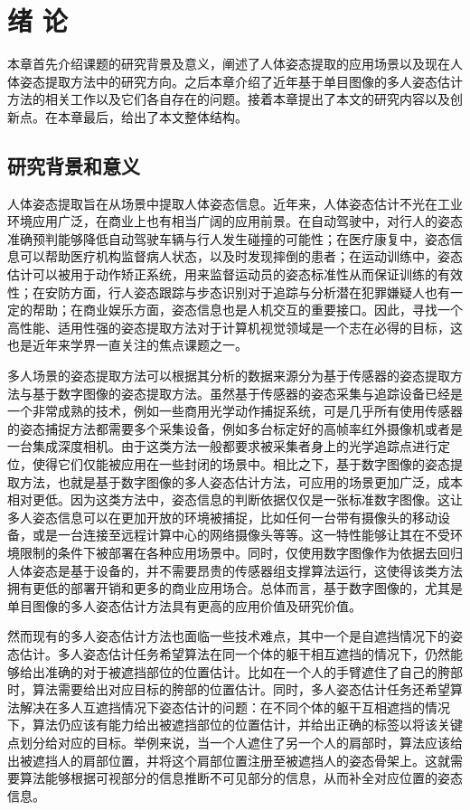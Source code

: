 \chapter{绪 论}
\label{cha:intro}

本章首先介绍课题的研究背景及意义，阐述了人体姿态提取的应用场景以及现在人体姿态提取方法中的研究方向。之后本章介绍了近年基于单目图像的多人姿态估计方法的相关工作以及它们各自存在的问题。接着本章提出了本文的研究内容以及创新点。在本章最后，给出了本文整体结构。

\section{研究背景和意义}
\label{sec:generalbackground}
人体姿态提取旨在从场景中提取人体姿态信息。近年来，人体姿态估计不光在工业环境应用广泛，在商业上也有相当广阔的应用前景。在自动驾驶中，对行人的姿态准确预判能够降低自动驾驶车辆与行人发生碰撞的可能性；在医疗康复中，姿态信息可以帮助医疗机构监督病人状态，以及时发现摔倒的患者；在运动训练中，姿态估计可以被用于动作矫正系统，用来监督运动员的姿态标准性从而保证训练的有效性；在安防方面，行人姿态跟踪与步态识别对于追踪与分析潜在犯罪嫌疑人也有一定的帮助；在商业娱乐方面，姿态信息也是人机交互的重要接口。因此，寻找一个高性能、适用性强的姿态提取方法对于计算机视觉领域是一个志在必得的目标，这也是近年来学界一直关注的焦点课题之一。

多人场景的姿态提取方法可以根据其分析的数据来源分为基于传感器的姿态提取方法与基于数字图像的姿态提取方法。虽然基于传感器的姿态采集与追踪设备已经是一个非常成熟的技术，例如一些商用光学动作捕捉系统，可是几乎所有使用传感器的姿态捕捉方法都需要多个采集设备，例如多台标定好的高帧率红外摄像机或者是一台集成深度相机。由于这类方法一般都要求被采集者身上的光学追踪点进行定位，使得它们仅能被应用在一些封闭的场景中。相比之下，基于数字图像的姿态提取方法，也就是基于数字图像的多人姿态估计方法，可应用的场景更加广泛，成本相对更低。因为这类方法中，姿态信息的判断依据仅仅是一张标准数字图像。这让多人姿态信息可以在更加开放的环境被捕捉，比如任何一台带有摄像头的移动设备，或是一台连接至远程计算中心的网络摄像头等等。这一特性能够让其在不受环境限制的条件下被部署在各种应用场景中。同时，仅使用数字图像作为依据去回归人体姿态是基于设备的，并不需要昂贵的传感器组支撑算法运行，这使得该类方法拥有更低的部署开销和更多的商业应用场合。总体而言，基于数字图像的，尤其是单目图像的多人姿态估计方法具有更高的应用价值及研究价值。

然而现有的多人姿态估计方法也面临一些技术难点，其中一个是自遮挡情况下的姿态估计。多人姿态估计任务希望算法在同一个体的躯干相互遮挡的情况下，仍然能够给出准确的对于被遮挡部位的位置估计。比如在一个人的手臂遮住了自己的胯部时，算法需要给出对应目标的胯部的位置估计。同时，多人姿态估计任务还希望算法解决在多人互遮挡情况下姿态估计的问题：在不同个体的躯干互相遮挡的情况下，算法仍应该有能力给出被遮挡部位的位置估计，并给出正确的标签以将该关键点划分给对应的目标。举例来说，当一个人遮住了另一个人的肩部时，算法应该给出被遮挡人的肩部位置，并将这个肩部位置注册至被遮挡人的姿态骨架上。这就需要算法能够根据可视部分的信息推断不可见部分的信息，从而补全对应位置的姿态信息。

